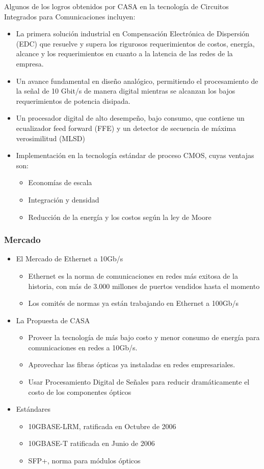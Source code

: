 \documentclass[a4paper]{article}
\begin{document}
Algunos de los logros obtenidos por \ac{CASA} en la tecnología de Circuitos Integrados para Comunicaciones incluyen:
\begin{itemize}
\item La primera solución industrial en Compensación Electrónica de Dispersión (EDC) que resuelve y supera los rigurosos requerimientos de costos, energía, alcance y los requerimientos en cuanto a la latencia de las redes de la empresa.
\item Un avance fundamental en diseño analógico, permitiendo el procesamiento de la señal de 10 Gbit/s de manera digital mientras se alcanzan los bajos requerimientos de potencia disipada.
\item Un procesador digital de alto desempeño, bajo consumo, que contiene un ecualizador feed forward (FFE) y un detector de secuencia de máxima verosimilitud (MLSD)
\item Implementación en la tecnología estándar de proceso CMOS, cuyas ventajas son:
  \begin{itemize}
  \item Economías de escala
  \item Integración y densidad
  \item Reducción de la energía y los costos según la ley de Moore
  \end{itemize}
\end{itemize}

\subsubsection{Mercado}
\begin{itemize}
\item El Mercado de Ethernet a 10Gb/s
  \begin{itemize}
  \item Ethernet es la norma de comunicaciones en redes más exitosa de la historia, con más de 3.000 millones de puertos vendidos hasta el momento
  \item Los comités de normas ya están trabajando en Ethernet a 100Gb/s
  \end{itemize}
\item La Propuesta de \ac{CASA}
  \begin{itemize}
  \item Proveer la tecnología de más bajo costo y menor consumo de energía para comunicaciones en redes a 10Gb/s.
  \item Aprovechar las fibras ópticas ya instaladas en redes empresariales.
  \item Usar Procesamiento Digital de Señales para reducir dramáticamente el costo de los componentes ópticos
  \end{itemize}
\item Estándares
  \begin{itemize}
  \item 10GBASE-LRM, ratificada en Octubre de 2006
  \item 10GBASE-T ratificada en Junio de 2006
  \item SFP+, norma para módulos ópticos
  \end{itemize}
\end{itemize}
\end{document}
